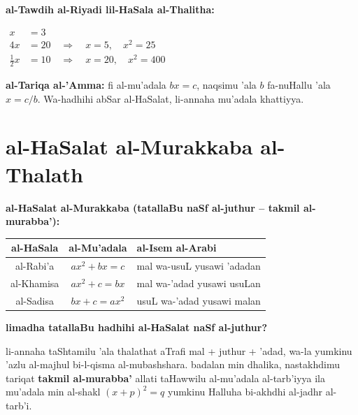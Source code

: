 \documentclass[11pt,a4paper]{book}
\begin{document}
\begin{mathexplain}
\textbf{al-Tawdih al-Riyadi lil-HaSala al-Thalitha:}

\begin{center}
$\begin{aligned}
  x &= 3 \\
  4x &= 20 \quad\Rightarrow\quad x = 5, \quad x^2 = 25 \\
  \tfrac{1}{2}x &= 10 \quad\Rightarrow\quad x = 20, \quad x^2 = 400
\end{aligned}$
\end{center}

\textbf{al-Tariqa al-'Amma:} fi al-mu'adala $bx = c$, naqsimu 'ala
$b$ fa-nuHallu 'ala $x = c/b$. Wa-hadhihi abSar al-HaSalat, li-annaha
mu'adala khattiyya.
\end{mathexplain}

\newpage

\section{al-HaSalat al-Murakkaba al-Thalath}

\begin{mathexplain}
\textbf{al-HaSalat al-Murakkaba (tatallaBu naSf al-juthur -- takmil
al-murabba'):}

\begin{center}
\begin{tabular}{|c|c|l|}
\hline
\textbf{al-HaSala} & \textbf{al-Mu'adala} & \textbf{al-Isem al-Arabi} \\
\hline
al-Rabi'a & $ax^2 + bx = c$ & mal wa-usuL yusawi 'adadan \\
\hline
al-Khamisa & $ax^2 + c = bx$ & mal wa-'adad yusawi usuLan \\
\hline
al-Sadisa & $bx + c = ax^2$ & usuL wa-'adad yusawi malan \\
\hline
\end{tabular}
\end{center}

\textbf{limadha tatallaBu hadhihi al-HaSalat naSf al-juthur?}

li-annaha taShtamilu 'ala thalathat aTrafi mal + juthur + 'adad,
wa-la yumkinu 'azlu al-majhul bi-l-qisma al-mubashshara. badalan
min dhalika, nastakhdimu tariqat \textbf{takmil al-murabba'}
allati taHawwilu al-mu'adala al-tarb'iyya ila mu'adala min al-shakl
$(x + p)^2 = q$ yumkinu Halluha bi-akhdhi al-jadhr al-tarb'i.
\end{mathexplain}
\end{document}
